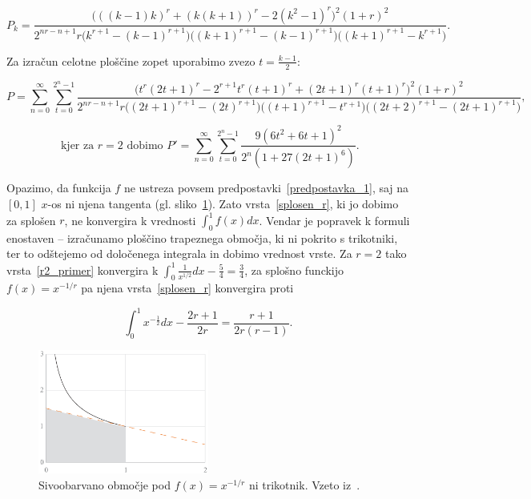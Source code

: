 \documentclass[a4paper, 12pt, titlepage]{article}
\begin{document}
\begin{equation*}
    P_k = \frac{
        \bigl(((k-1)k)^r + (k(k+1))^r - 2(k^2-1)^r\bigr)^2(1+r)^2
    }{
        2^{nr-n+1} r \bigl(k^{r+1} - (k-1)^{r+1}\bigr) \bigl((k+1)^{r+1} - (k-1)^{r+1}\bigr) \bigl((k+1)^{r+1} - k^{r+1}\bigr)
    }\text{.}
\end{equation*}

Za izračun celotne ploščine zopet uporabimo zvezo $ t = \frac{k-1}{2} $:

\begin{equation}
    P = \sum_{n=0}^{\infty} \sum_{t=0}^{2^n-1}
    \frac{
        \bigl(t^r (2t+1)^r - 2^{r+1} t^r (t+1)^r + (2t+1)^r(t+1)^r\bigr)^2(1+r)^2
    }{
        2^{nr-n+1}r
        \bigl((2t+1)^{r+1}-(2t)^{r+1}\bigr)
        \bigl((t + 1)^{r+1} - t^{r+1}\bigr)
        \bigl((2t + 2)^{r+1} - (2t+1)^{r+1}\bigr)
    }\text{,}
    \label{splosen_r}
\end{equation}

\begin{equation}
    \text{ kjer za } r = 2 \text{ dobimo }
    P' = \sum_{n=0}^{\infty} \sum_{t=0}^{2^n-1} \frac{9(6t^2+6t+1)^2}{2^n(1+27(2t+1)^6)}\text{.}
    \label{r2_primer}
\end{equation}

Opazimo, da funkcija $ f $ ne ustreza povsem predpostavki~\ref{predpostavka_1}, saj na $ [0,1] $ $ x $-os ni njena tangenta (gl. sliko~\ref{r_funkcija}). Zato vrsta~\ref{splosen_r}, ki jo dobimo za splošen $ r $, ne konvergira k vrednosti $ \int_{0}^{1}f(x)dx $. Vendar je popravek k formuli enostaven -- izračunamo ploščino trapeznega območja, ki ni pokrito s trikotniki, ter to odštejemo od določenega integrala in dobimo vrednost vrste. Za $ r = 2 $ tako vrsta~\ref{r2_primer} konvergira k $ \int_{0}^{1}\frac{1}{x^{1/2}}dx - \frac{5}{4} = \frac{3}{4} $, za splošno funckijo $ f(x)=x^{-1/r} $ pa njena vrsta~\ref{splosen_r} konvergira proti

\begin{equation*}
    \int_{0}^{1}x^{-\frac{1}{2}}dx - \frac{2r+1}{2r} = \frac{r+1}{2r(r-1)}\text{.}
\end{equation*}

\begin{figure}[h!]
    \centering
    \includegraphics[width=0.5\textwidth]{slike/r_funkcija.png}
    \caption{Sivoobarvano območje pod $ f(x) = x^{-1/r} $ ni trikotnik. Vzeto iz~\cite{osnovni_clanek}.}
    \label{r_funkcija}
\end{figure}
\end{document}
